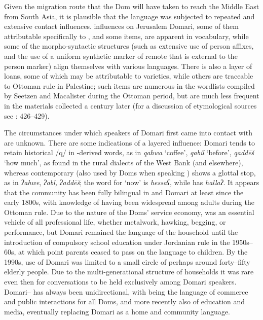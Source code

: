 \documentclass[output=paper]{langsci/langscibook}
\begin{document}
Given the migration route that the Dom will have taken to reach the Middle East from South Asia, it is plausible that the language was subjected to repeated and extensive contact influences.  influences on Jerusalem Domari, some of them attributable specifically to  , and some  items, are apparent in vocabulary, while some of the morpho-syntactic structures (such as extensive use of person affixes, and the use of a uniform synthetic marker of remote  that is external to the person marker) align themselves with various  languages. There is also a layer of  loans, some of which may be attributable to  varieties, while others are traceable to Ottoman rule in Palestine; such items are numerous in the wordlists compiled by Seetzen and Macalister during the Ottoman period, but are much less frequent in the materials collected a century later (for a discussion of etymological sources see \citealt{Matras2012}: 426–429).

The circumstances under which speakers of Domari first came into contact with  are unknown. There are some indications of a layered influence: Domari tends to retain historical /q/ in -derived words, as in \textit{qahwa} ‘coffee’, \textit{qabil} ‘before’, \textit{qaddēš} ‘how much’, as found in the rural dialects of the West Bank (and elsewhere), whereas contemporary   (also used by Doms when speaking ) shows a glottal stop, as in \textit{ʔahwe}, \textit{ʔabl,} \textit{ʔaddēš}; the word for ‘now’ is \textit{hessaʕ}, while   has \textit{hallaʔ}. It appears that the community has been fully bilingual in  and Domari at least since the early 1800s, with knowledge of  having been widespread among adults during the Ottoman rule. Due to the nature of the Doms’ service economy,  was an essential vehicle of all professional life, whether metalwork, hawking, begging, or performance, but Domari remained the language of the household until the introduction of compulsory school education under {Jordanian} rule in the 1950s–60s, at which point parents ceased to pass on the language to children. By the 1990s, use of Domari was limited to a small circle of perhaps around forty–fifty elderly people. Due to the multi-generational structure of households it was rare even then for conversations to be held exclusively among Domari speakers. Domari–  has always been unidirectional, with  being the language of commerce and public interactions for all Doms, and more recently also of education and media, eventually replacing Domari as a home and community language.
\end{document}
